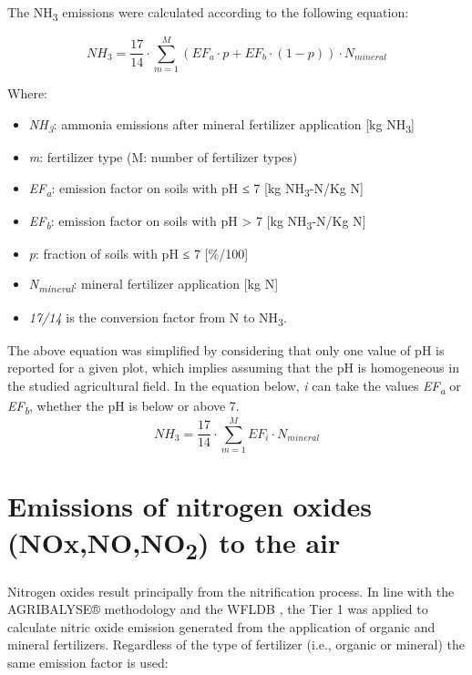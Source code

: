 \documentclass[openany]{book}
\begin{document}
The NH\textsubscript{3} emissions were calculated according to the following equation:

\[NH_3=\frac{17}{14} \cdot \sum_{m=1}^{M}(EF_a \cdot p + EF_b \cdot (1-p)) \cdot N_{mineral} \]

Where:

\begin{itemize}
\item
  \emph{NH\textsubscript{3}}: ammonia emissions after mineral fertilizer application {[}kg NH\textsubscript{3}{]}
\item
  \emph{m}: fertilizer type (M: number of fertilizer types)
\item
  \emph{EF\textsubscript{a}}: emission factor on soils with pH ≤ 7 {[}kg NH\textsubscript{3}-N/Kg N{]}
\item
  \emph{EF\textsubscript{b}}: emission factor on soils with pH \textgreater{} 7 {[}kg NH\textsubscript{3}-N/Kg N{]}
\item
  \emph{p}: fraction of soils with pH ≤ 7 {[}\%/100{]}
\item
  \emph{N\textsubscript{mineral}}: mineral fertilizer application {[}kg N{]}
\item
  \emph{17/14} is the conversion factor from N to NH\textsubscript{3}.
\end{itemize}

The above equation was simplified by considering that only one value of pH is reported for a given plot, which implies assuming that the pH is homogeneous in the studied agricultural field. In the equation below, \emph{i} can take the values \emph{EF\textsubscript{a}} or \emph{EF\textsubscript{b}}, whether the pH is below or above 7.\\
\[NH_3=\frac{17}{14} \cdot \sum_{m=1}^{M} EF_i \cdot N_{mineral}  \]

\hypertarget{emissions-of-nitrogen-oxides-noxnono2-to-the-air}{%
\section{\texorpdfstring{Emissions of nitrogen oxides (NOx,NO,NO\textsubscript{2}) to the air}{Emissions of nitrogen oxides (NOx,NO,NO2) to the air}}\label{emissions-of-nitrogen-oxides-noxnono2-to-the-air}}

Nitrogen oxides result principally from the nitrification process. In line with the AGRIBALYSE® methodology \citep{Koch2015} and the WFLDB \citep{nemecek2014}, the \citet{emep-eea2009} Tier 1 was applied to calculate nitric oxide emission generated from the application of organic and mineral fertilizers. Regardless of the type of fertilizer (i.e., organic or mineral) the same emission factor is used:
\end{document}
